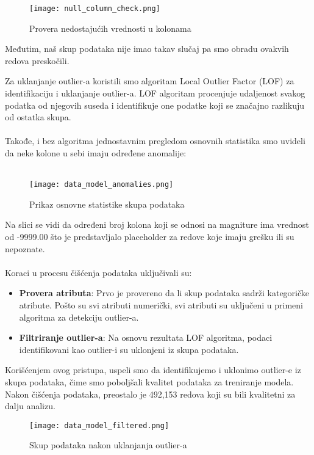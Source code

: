 \documentclass[a4paper,12pt]{article}
\begin{document}
\begin{figure}[H]
\centering
\texttt{[image: null\_column\_check.png]}
\caption{Provera nedostajućih vrednosti u kolonama}
\label{fig:sql_query}
\end{figure}

Međutim, naš skup podataka nije imao takav slučaj pa smo obradu ovakvih redova preskočili.

\clearpage
Za uklanjanje outlier-a koristili smo algoritam Local Outlier Factor (LOF) za identifikaciju i uklanjanje outlier-a. LOF algoritam procenjuje udaljenost svakog podatka od njegovih suseda i identifikuje one podatke koji se značajno razlikuju od ostatka skupa.\\\\
Takođe, i bez algoritma jednostavnim pregledom osnovnih statistika smo uvideli da neke kolone u sebi imaju određene anomalije:\\\\

\begin{figure}[H]
\centering
\texttt{[image: data\_model\_anomalies.png]}
\caption{Prikaz osnovne statistike skupa podataka}
\label{fig:sql_query}
\end{figure}

Na slici se vidi da određeni broj kolona koji se odnosi na magniture ima vrednost od -9999.00 što je predstavljalo placeholder za redove koje imaju grešku ili su nepoznate.\\\\
Koraci u procesu čišćenja podataka uključivali su:
\begin{itemize}
    \item \textbf{Provera atributa}: Prvo je provereno da li skup podataka sadrži kategoričke atribute. Pošto su svi atributi numerički, svi atributi su uključeni u primeni algoritma za detekciju outlier-a.
    \item \textbf{Filtriranje outlier-a}: Na osnovu rezultata LOF algoritma, podaci identifikovani kao outlier-i su uklonjeni iz skupa podataka.
\end{itemize}
Korišćenjem ovog pristupa, uspeli smo da identifikujemo i uklonimo outlier-e iz skupa podataka, čime smo poboljšali kvalitet podataka za treniranje modela. Nakon čišćenja podataka, preostalo je 492,153 redova koji su bili kvalitetni za dalju analizu.

\begin{figure}[H]
\centering
\texttt{[image: data\_model\_filtered.png]}
\caption{Skup podataka nakon uklanjanja outlier-a}
\label{fig:sql_query}
\end{figure}
\end{document}
